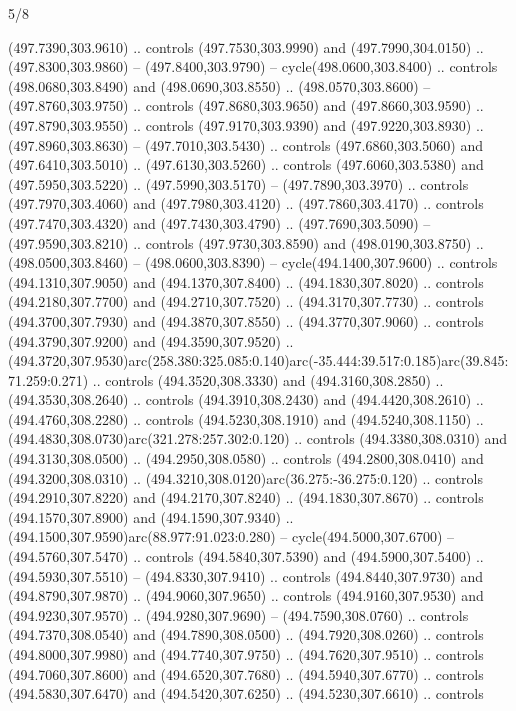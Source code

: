 \begin{flagdescription}{5/8}
\begin{scope}[xshift=0.5\flaglength,yshift=0.5\flagwidth,scale=\flagwidth/475.63]
\begin{scope}[y=0.8pt, x=0.8pt, yscale=-1, xscale=1,shift={(-450,-300)}]
\begin{scope}[cm={{1.0,0.0,0.0,1.0,(-0.0002,0.12556)}},cm={{1.0,0.0,0.0,1.0,(0.00179,0.0)}}]
\begin{scope}[cm={{1.11592,0.0,0.0,1.11592,(-106.89933,-41.77764)}}]
\begin{scope}[draw=black,fill=cfff]
\begin{scope}[fill=black]
  (497.7390,303.9610) .. controls (497.7530,303.9990) and (497.7990,304.0150) ..
  (497.8300,303.9860) -- (497.8400,303.9790) -- cycle(498.0600,303.8400) ..
  controls (498.0680,303.8490) and (498.0690,303.8550) .. (498.0570,303.8600) --
  (497.8760,303.9750) .. controls (497.8680,303.9650) and (497.8660,303.9590) ..
  (497.8790,303.9550) .. controls (497.9170,303.9390) and (497.9220,303.8930) ..
  (497.8960,303.8630) -- (497.7010,303.5430) .. controls (497.6860,303.5060) and
  (497.6410,303.5010) .. (497.6130,303.5260) .. controls (497.6060,303.5380) and
  (497.5950,303.5220) .. (497.5990,303.5170) -- (497.7890,303.3970) .. controls
  (497.7970,303.4060) and (497.7980,303.4120) .. (497.7860,303.4170) .. controls
  (497.7470,303.4320) and (497.7430,303.4790) .. (497.7690,303.5090) --
  (497.9590,303.8210) .. controls (497.9730,303.8590) and (498.0190,303.8750) ..
  (498.0500,303.8460) -- (498.0600,303.8390) -- cycle(494.1400,307.9600) ..
  controls (494.1310,307.9050) and (494.1370,307.8400) .. (494.1830,307.8020) ..
  controls (494.2180,307.7700) and (494.2710,307.7520) .. (494.3170,307.7730) ..
  controls (494.3700,307.7930) and (494.3870,307.8550) .. (494.3770,307.9060) ..
  controls (494.3790,307.9200) and (494.3590,307.9520) ..
  (494.3720,307.9530)arc(258.380:325.085:0.140)arc(-35.444:39.517:0.185)arc(39.845:71.259:0.271)
  .. controls (494.3520,308.3330) and (494.3160,308.2850) .. (494.3530,308.2640)
  .. controls (494.3910,308.2430) and (494.4420,308.2610) .. (494.4760,308.2280)
  .. controls (494.5230,308.1910) and (494.5240,308.1150) ..
  (494.4830,308.0730)arc(321.278:257.302:0.120) .. controls (494.3380,308.0310)
  and (494.3130,308.0500) .. (494.2950,308.0580) .. controls (494.2800,308.0410)
  and (494.3200,308.0310) .. (494.3210,308.0120)arc(36.275:-36.275:0.120) ..
  controls (494.2910,307.8220) and (494.2170,307.8240) .. (494.1830,307.8670) ..
  controls (494.1570,307.8900) and (494.1590,307.9340) ..
  (494.1500,307.9590)arc(88.977:91.023:0.280) -- cycle(494.5000,307.6700) --
  (494.5760,307.5470) .. controls (494.5840,307.5390) and (494.5900,307.5400) ..
  (494.5930,307.5510) -- (494.8330,307.9410) .. controls (494.8440,307.9730) and
  (494.8790,307.9870) .. (494.9060,307.9650) .. controls (494.9160,307.9530) and
  (494.9230,307.9570) .. (494.9280,307.9690) -- (494.7590,308.0760) .. controls
  (494.7370,308.0540) and (494.7890,308.0500) .. (494.7920,308.0260) .. controls
  (494.8000,307.9980) and (494.7740,307.9750) .. (494.7620,307.9510) .. controls
  (494.7060,307.8600) and (494.6520,307.7680) .. (494.5940,307.6770) .. controls
  (494.5830,307.6470) and (494.5420,307.6250) .. (494.5230,307.6610) .. controls

\end{scope}
\end{scope}
\end{scope}
\end{scope}
\end{scope}
\end{scope}
\end{flagdescription}
